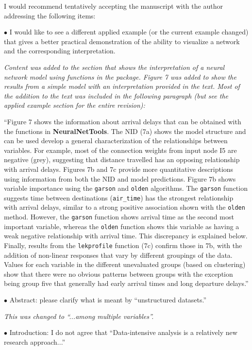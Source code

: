 \documentclass[letterpaper,12pt]{article}
\begin{document}
I would recommend tentatively accepting the manuscript with the author addressing the following items:

$\bullet$ I would like to see a different applied example (or the current example changed) that gives a better practical demonstration of the ability to visualize a network and the corresponding interpretation.

{\it Content was added to the section that shows the interpretation of a neural network model using functions in the package.  Figure 7 was added to show the results from a simple model with an interpretation provided in the text.  Most of the addition to the text was included in the following paragraph (but see the applied example section for the entire revision): 

``Figure 7 shows the information about arrival delays that can be obtained with the functions in \textbf{NeuralNetTools}. The NID (7a) shows the model structure and can be used develop a general characterization of the relationships between variables.  For example, most of the connection weights from input node I5 are negative (grey), suggesting that distance travelled has an opposing relationship with arrival delays. Figures 7b and 7c provide more quantitative descriptions using information from both the NID and model predictions.  Figure 7b shows variable importance using the \texttt{garson} and \texttt{olden} algorithms.  The \texttt{garson} function suggests time between destinations (\texttt{air\_time}) has the strongest relationship with arrival delays, similar to a strong positive association shown with the \texttt{olden} method.  However, the \texttt{garson} function shows arrival time as the second most important variable, whereas the \texttt{olden} function shows this variable as having a weak negative relationship with arrival time. This discrepancy is explained below. Finally, results from the \texttt{lekprofile} function (7c) confirm those in 7b, with the addition of non-linear responses that vary by different groupings of the data.  Values for each variable in the different unevaluated groups (based on clustering) show that there were no obvious patterns between groups with the exception being group five that generally had early arrival times and long departure delays.''    
}

$\bullet$ Abstract:  please clarify what is meant by ``unstructured datasets.''

{\it This was changed to ``...among multiple variables''.}

$\bullet$ Introduction:  I do not agree that ``Data-intensive analysis is a relatively new research approach...''
\end{document}
